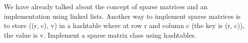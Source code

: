 We have already talked about the concept of sparse matrices and
an implementation using linked lists.
Another way to implement sparse matrices is to store
((r, c), v) in a hashtable
where at row r and column c (the key is (r, c)), the value is v.
Implement a sparse matrix class using hashtables.

